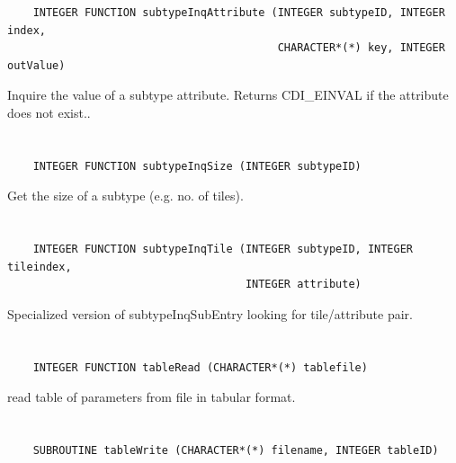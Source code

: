 \begin{verbatim}
    INTEGER FUNCTION subtypeInqAttribute (INTEGER subtypeID, INTEGER index,
                                          CHARACTER*(*) key, INTEGER outValue)
\end{verbatim}

Inquire the value of a subtype attribute. Returns CDI_EINVAL if the attribute does not exist..


\section*{\tt {}}

\begin{verbatim}
    INTEGER FUNCTION subtypeInqSize (INTEGER subtypeID)
\end{verbatim}

Get the size of a subtype (e.g. no. of tiles).


\section*{\tt {}}

\begin{verbatim}
    INTEGER FUNCTION subtypeInqTile (INTEGER subtypeID, INTEGER tileindex,
                                     INTEGER attribute)
\end{verbatim}

Specialized version of subtypeInqSubEntry looking for tile/attribute pair.


\section*{\tt {}}

\begin{verbatim}
    INTEGER FUNCTION tableRead (CHARACTER*(*) tablefile)
\end{verbatim}

read table of parameters from file in tabular format.


\section*{\tt {}}

\begin{verbatim}
    SUBROUTINE tableWrite (CHARACTER*(*) filename, INTEGER tableID)
\end{verbatim}

